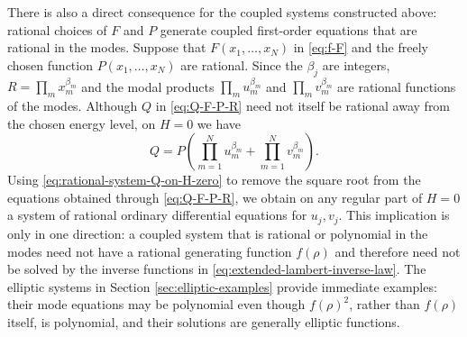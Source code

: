 \documentclass[11pt,a4paper]{article}
\numberwithin{equation}{section}
\begin{document}
There is also a direct consequence for the coupled systems constructed above: rational choices of $F$ and $P$ generate coupled first-order equations that are rational in the modes.
Suppose that $F(x_1,\dots,x_N)$ in \eqref{eq:f-F} and the freely chosen function $P(x_1,\dots,x_N)$ are rational.
Since the $\beta_j$ are integers, $R=\prod_m x_m^{\beta_m}$ and the modal products $\prod_m u_m^{\beta_m}$ and $\prod_m v_m^{\beta_m}$ are rational functions of the modes.
Although $Q$ in \eqref{eq:Q-F-P-R} need not itself be rational away from the chosen energy level, on $H=0$ we have
\begin{equation}
    Q
    =P\left(
        \prod_{m=1}^{N}u_m^{\beta_m}
        +\prod_{m=1}^{N}v_m^{\beta_m}
    \right).
    \label{eq:rational-system-Q-on-H-zero}
\end{equation}
Using \eqref{eq:rational-system-Q-on-H-zero} to remove the square root from the equations obtained through \eqref{eq:Q-F-P-R}, we obtain on any regular part of $H=0$ a system of rational ordinary differential equations for $u_j,v_j$.
This implication is only in one direction: a coupled system that is rational or polynomial in the modes need not have a rational generating function $f(\rho)$ and therefore need not be solved by the inverse functions in \eqref{eq:extended-lambert-inverse-law}.
The elliptic systems in Section \ref{sec:elliptic-examples} provide immediate examples: their mode equations may be polynomial even though $f(\rho)^2$, rather than $f(\rho)$ itself, is polynomial, and their solutions are generally elliptic functions.
\end{document}
